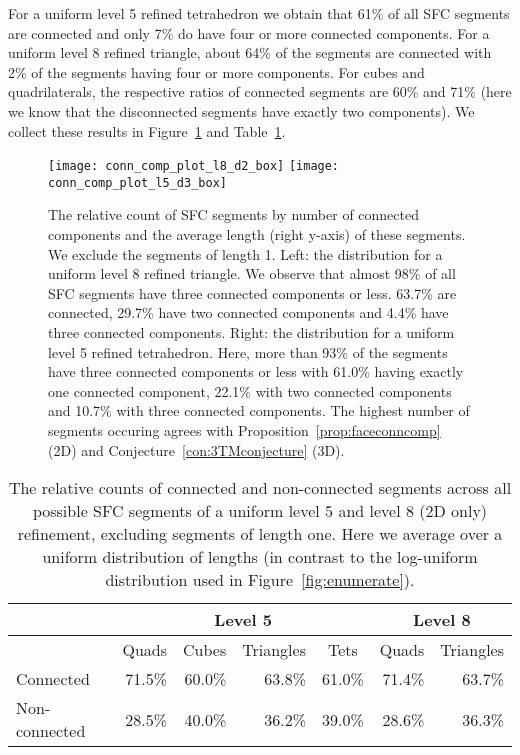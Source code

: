 \documentclass[a4paper,11pt]{article}
\newcommand{\figref}[1]{Figure~\ref{fig:#1}}
\begin{document}
For a uniform level 5 refined tetrahedron we obtain that 61\% of all
SFC segments are connected and only 7\% do have four or more connected
components.
For a uniform level 8 refined triangle, about 64\% of the segments are connected
with 2\% of the segments having four or more components.
For cubes and quadrilaterals, the respective ratios of connected segments are
60\% and 71\% (here we know that the disconnected segments have exactly two
components).
We collect these results in Figure~\ref{fig:tritetnumcomp} and
Table~\ref{tab:componentpercent}.



\begin{figure}
        \begin{center}
\texttt{[image: conn\_comp\_plot\_l8\_d2\_box]}
\hfill
\texttt{[image: conn\_comp\_plot\_l5\_d3\_box]}
        \end{center}
\caption{The relative count of SFC segments by number of connected components and
the average length (right y-axis) of these segments.
We exclude the segments of length 1.
Left: the distribution for a uniform level 8 refined triangle. We observe that
almost 98\% of all SFC segments have three connected components or less.
63.7\% are connected, 29.7\% have two connected components and 4.4\% have
three connected components.
Right: the distribution for a uniform level 5 refined tetrahedron.
Here, more than 93\% of the segments have three connected components or less with
61.0\% having exactly one connected component, 22.1\% with two connected 
components and 10.7\% with three connected components.
The
highest number of segments occuring agrees with
Proposition~\ref{prop:faceconncomp} (2D) and
Conjecture~\ref{con:3TMconjecture} (3D).}
\label{fig:tritetnumcomp}
\end{figure}

\begin{table}
        \begin{center}
\begin{tabular}{|l|r|r|r|r||r|r|}
\hline
&\multicolumn{4}{|c||}{Level 5} & \multicolumn{2}{c|}{Level 8}\\
\hline
& Quads & Cubes & Triangles &
\multicolumn{1}{c||}{Tets} & Quads & Triangles\\ \hline
Connected     &71.5\% & 60.0\% &63.8\% & 61.0\% &71.4\%&63.7\%\\
Non-connected &28.5\% & 40.0\% &36.2\% & 39.0\% &28.6\%&36.3\%\\
\hline
\end{tabular}
        \end{center}
\caption{The relative counts of connected and non-connected segments across all
possible SFC segments of a uniform level 5 and level 8 (2D only) refinement,
excluding segments of length one.
Here we average over a uniform distribution of lengths (in contrast to
the log-uniform distribution used in \figref{enumerate}).}
\label{tab:componentpercent}
\end{table}
\end{document}
